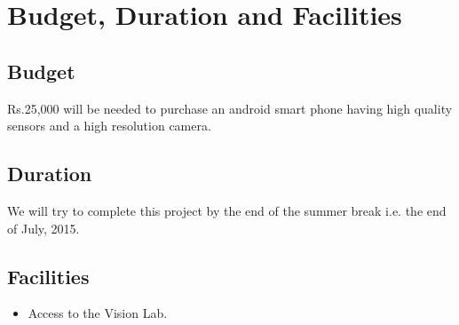 \documentclass{article}
\begin{document}
	\section{Budget, Duration and Facilities}	
		\subsection{Budget}
			Rs.25,000 will be needed to purchase an android smart phone having high quality sensors and a high resolution camera.
		\subsection{Duration}
			We will try to complete this project by the end of the summer break i.e. the end of July, 2015. 
		\subsection{Facilities}
		    \begin{itemize}
		    \item Access to the Vision Lab.
		    \end{itemize}
\end{document}
